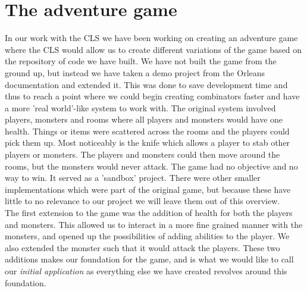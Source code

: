 \section{The adventure game} \label{adventureGame}
In our work with the CLS we have been working on creating an adventure game where the CLS would allow us to create different variations of the game based on the repository of code we have built. We have not built the game from the ground up, but instead we have taken a demo project from the Orleans documentation \cite{AdventureGame} and extended it. This was done to save development time and thus to reach a point where we could begin creating combinators faster and have a more 'real world'-like system to work with. The original system involved players, monsters and rooms where all players and monsters would have one health. Things or items were scattered across the rooms and the players could pick them up. Most noticeably is the knife which allows a player to stab other players or monsters. The players and monsters could then move around the rooms, but the monsters would never attack. The game had no objective and no way to win. It served as a 'sandbox' project. There were other smaller implementations which were part of the original game, but because these have little to no relevance to our project we will leave them out of this overview.\\
The first extension to the game was the addition of health for both the players and monsters. This allowed us to interact in a more fine grained manner with the monsters, and opened up the possibilities of adding abilities to the player. We also extended the monster such that it would attack the players. These two additions makes our foundation for the game, and is what we would like to call our \textit{initial application} as everything else we have created revolves around this foundation.\\

